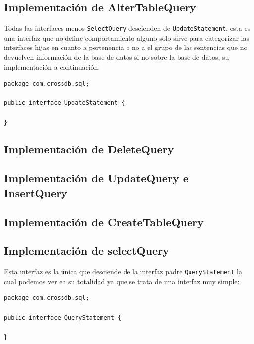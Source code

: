 \subsection{Implementación de AlterTableQuery}
Todas las interfaces menos \verb=SelectQuery= descienden de \verb=UpdateStatement=, esta es una interfaz que no define comportamiento alguno solo sirve para categorizar las interfaces hijas en cuanto a pertenencia o no a el grupo de las sentencias que no devuelven información de la base de datos si no sobre la base de datos, su implementación a continuación:

\begin{lstlisting}[title=interfaz UpdateStatement]
package com.crossdb.sql;

public interface UpdateStatement {

}
\end{lstlisting}




\subsection{Implementación de DeleteQuery}




\subsection{Implementación de UpdateQuery e InsertQuery}




\subsection{Implementación de CreateTableQuery}




\subsection{Implementación de selectQuery}

Esta interfaz es la única que desciende de la interfaz padre \verb=QueryStatement= la cual podemos ver en su totalidad ya que se trata de una interfaz muy simple:

\begin{lstlisting}[title=código interfaz QueryStatement]
package com.crossdb.sql;

public interface QueryStatement {

}
\end{lstlisting}

